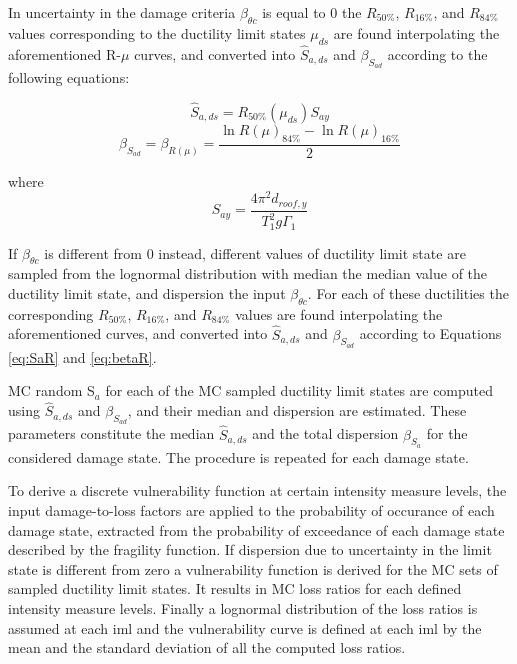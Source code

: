 In uncertainty in the damage criteria $\beta_{\theta c}$ is equal to 0 the $R_{50\%}$, $R_{16\%}$, and $R_{84\%}$ values corresponding to the ductility limit states $\mu_{ds}$ are found interpolating the aforementioned R-$\mu$ curves, and converted into $\hat{S}_{a,ds}$ and $\beta_{S_{a d}}$ according to the following equations:

\begin{equation}
\hat{S}_{a,ds} = R_{50\%}(\mu_{ds}) S_{ay}
\label{eq:SaR}
\end{equation}
\begin{equation}
\beta_{S_{a d}} = \beta_{R(\mu)} = \frac{\ln R(\mu)_{84\%} - \ln R(\mu)_{16\%}}{2}
\label{eq:betaR}
\end{equation} 

where
\begin{equation}
S_{ay} = \frac{4 \pi^2 d_{roof,y}}{T_1^2 g \Gamma_1}
\label{eq:Say}
\end{equation}

If $\beta_{\theta c}$ is different from 0 instead, different values of ductility limit state are sampled from the lognormal distribution with median the median value of the ductility limit state, and dispersion the input $\beta_{\theta c}$.
For each of these ductilities the corresponding $R_{50\%}$, $R_{16\%}$, and $R_{84\%}$ values are found interpolating the aforementioned curves, and converted into $\hat{S}_{a,ds}$ and $\beta_{S_{a d}}$ according to Equations \ref{eq:SaR} and \ref{eq:betaR}.

MC random S$_a$ for each of the MC sampled ductility limit states are computed using $\hat{S}_{a,ds}$ and $\beta_{S_{a d}}$, and their median and dispersion are estimated. These parameters constitute the median $\hat{S}_{a,ds}$ and the total dispersion $\beta_{S_a}$ for the considered damage state. The procedure is repeated for each damage state.

To derive a discrete vulnerability function at certain intensity measure levels, the input damage-to-loss factors are applied to the probability of occurance of each damage state, extracted from the probability of exceedance of each damage state described by the fragility function.
If dispersion due to uncertainty in the limit state is different from zero a vulnerability function is derived for the MC sets of sampled ductility limit states. It results in MC loss ratios for each defined intensity measure levels. Finally a lognormal distribution of the loss ratios is assumed at each iml and the vulnerability curve is defined at each iml by the mean and the standard deviation of all the computed loss ratios.

